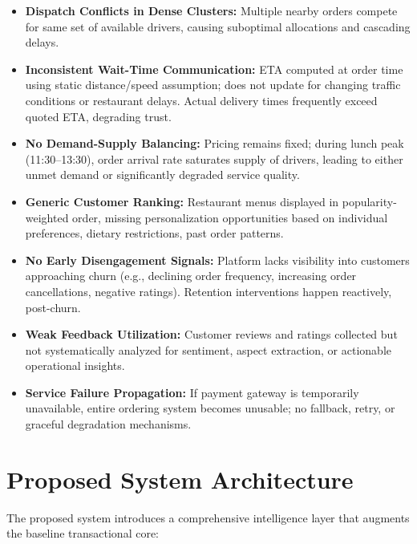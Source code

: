 \documentclass[12pt,a4paper]{report}
\begin{document}
\begin{itemize}
    \item \textbf{Dispatch Conflicts in Dense Clusters:} Multiple nearby orders compete for same set of available drivers, causing suboptimal allocations and cascading delays.
    
    \item \textbf{Inconsistent Wait-Time Communication:} ETA computed at order time using static distance/speed assumption; does not update for changing traffic conditions or restaurant delays. Actual delivery times frequently exceed quoted ETA, degrading trust.
    
    \item \textbf{No Demand-Supply Balancing:} Pricing remains fixed; during lunch peak (11:30--13:30), order arrival rate saturates supply of drivers, leading to either unmet demand or significantly degraded service quality.
    
    \item \textbf{Generic Customer Ranking:} Restaurant menus displayed in popularity-weighted order, missing personalization opportunities based on individual preferences, dietary restrictions, past order patterns.
    
    \item \textbf{No Early Disengagement Signals:} Platform lacks visibility into customers approaching churn (e.g., declining order frequency, increasing order cancellations, negative ratings). Retention interventions happen reactively, post-churn.
    
    \item \textbf{Weak Feedback Utilization:} Customer reviews and ratings collected but not systematically analyzed for sentiment, aspect extraction, or actionable operational insights.
    
    \item \textbf{Service Failure Propagation:} If payment gateway is temporarily unavailable, entire ordering system becomes unusable; no fallback, retry, or graceful degradation mechanisms.
\end{itemize}

\section{Proposed System Architecture}

The proposed system introduces a comprehensive intelligence layer that augments the baseline transactional core:
\end{document}
